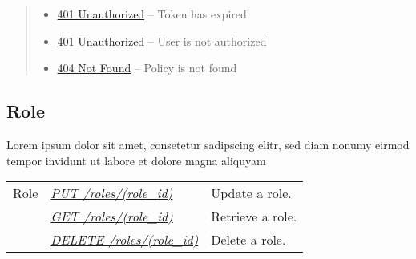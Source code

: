 \documentclass[letterpaper,10pt,english]{sphinxmanual}
\begin{document}
\begin{fulllineitems}
\begin{quote}
\begin{description}
\begin{itemize}
\item {} 
\href{http://www.w3.org/Protocols/rfc2616/rfc2616-sec10.html\#sec10.4.2}{401 Unauthorized} -- Token has expired

\item {} 
\href{http://www.w3.org/Protocols/rfc2616/rfc2616-sec10.html\#sec10.4.2}{401 Unauthorized} -- User is not authorized

\item {} 
\href{http://www.w3.org/Protocols/rfc2616/rfc2616-sec10.html\#sec10.4.5}{404 Not Found} -- Policy is not found

\end{itemize}

\end{description}\end{quote}

\end{fulllineitems}



\subsection{Role}
\label{\detokenize{resources/role::doc}}\label{\detokenize{resources/role:id1}}\label{\detokenize{resources/role:role}}
Lorem ipsum dolor sit amet, consetetur sadipscing elitr, sed diam nonumy eirmod tempor invidunt ut labore et dolore magna aliquyam

\noindent\begin{tabulary}{\linewidth}{|L|L|L|}
\hline
{}\relax &\relax &\relax \\
\hline
Role
&
{\hyperref[\detokenize{resources/role:put--roles-(role_id)}]{\emph{PUT /roles/(role\_id)}}}
&
Update a role.
\\
\hline&
{\hyperref[\detokenize{resources/role:get--roles-(role_id)}]{\emph{GET /roles/(role\_id)}}}
&
Retrieve a role.
\\
\hline&
{\hyperref[\detokenize{resources/role:delete--roles-(role_id)}]{\emph{DELETE /roles/(role\_id)}}}
&
Delete a role.
\\
\hline\end{tabulary}


\begin{DUlineblock}{0em}
\item[] 
\end{DUlineblock}
\end{document}
